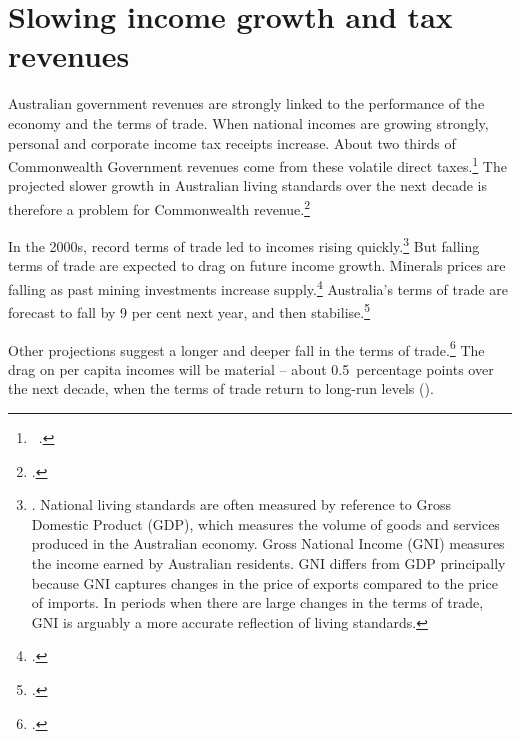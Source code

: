\documentclass[twoside,english]{grattanBudgetRepairb5portrait}
\begin{document}
\section{Slowing income growth and tax revenues}\label{sec:FISCAL-3-1}
Australian government revenues are strongly linked to the performance of the economy and the terms of trade. When national incomes are growing strongly, personal and corporate income tax receipts increase. About two thirds of Commonwealth Government revenues come from these volatile direct taxes.\footnote{\gao\ \textcite[][BP~No.~1, p.~5-18]{Treasury2014-Budget-Papers-2014-15}.}  The projected slower growth in Australian living standards over the next decade is therefore a problem for Commonwealth revenue.\footcite[][vii]{HenryTaxReview2010}

In the 2000s, record terms of trade led to incomes rising quickly.\footnote{\textcite{Carmody2013}. National living standards are often measured by reference to Gross Domestic Product (GDP), which measures the volume of goods and services produced in the Australian economy. Gross National Income (GNI) measures the income earned by Australian residents. GNI differs from GDP principally because GNI captures changes in the price of exports compared to the price of imports. In periods when there are large changes in the terms of trade, GNI is arguably a more accurate reflection of living standards.}  But falling terms of trade are expected to drag on future income growth. Minerals prices are falling as past mining investments increase supply.\footcites{Stevens2013}{MinifieCherastidthamMullerworthEtAl2013}  Australia’s terms of trade are forecast to fall by 9 per cent next year, and then stabilise.\footcite[][2--5]{Treasury2015BudgetPapers201516}   

Other projections suggest a longer and deeper fall in the terms of trade.\footcite{Treasury2014-Budget-Papers-2014-15}  The drag on per capita incomes will be material – about 0.5~percentage points over the next decade, when the terms of trade return to long-run levels ().
\end{document}
